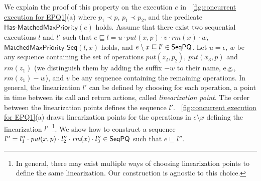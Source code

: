 We explain the proof of this property on the execution $e$ in \figurename~\ref{fig:concurrent execution for EPQ1}(a) where $p_1 \prec p$, $p_1 \prec p_2$, and the predicate $\mathsf{Has\text{-}MatchedMaxPriority}(e)$ holds. Assume that there exist two sequential executions $l$ and $l'$ such that $e \sqsubseteq l=u \cdot \textit{put}(x,p) \cdot v \cdot \textit{rm}(x) \cdot w$, $\mathsf{MatchedMaxPriority\text{-}Seq}(l,x)$ holds, and $e \setminus x \sqsubseteq l' \in \mathsf{SeqPQ}$. Let $u=\epsilon$, $w$ be any sequence containing the set of operations $\textit{put}(z_2,p_2)$, $\textit{put}(x_3,p)$ and $\textit{rm}(z_1)$ (we distinguish them by adding the suffix $-w$ to their name, e.g., $\textit{rm}(z_1)-w$), and $v$ be any sequence containing the remaining operations. In general, the linearization $l'$ can be defined by choosing for each operation, a point in time between its call and return actions, called \emph{linearization point}. The order between the linearization points defines the sequence $l'$. \figurename~\ref{fig:concurrent execution for EPQ1}(a) draws linearization points for the operations in $e \setminus x$ defining the linearization $l'$~\footnote{In general, there may exist multiple ways of choosing linearization points to define the same linearization. Our construction is agnostic to this choice.}.
We show how to construct a sequence $l''= l''_1 \cdot \textit{put}(x,p) \cdot l''_2 \cdot \textit{rm}(x) \cdot l''_3\in\mathsf{SeqPQ}$ such that $e \sqsubseteq l''$.
